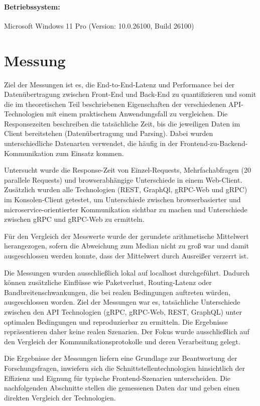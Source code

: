 \paragraph{Betriebssystem:}
Microsoft Windows 11 Pro (Version: 10.0.26100, Build 26100)

\clearpage
\section{Messung}
Ziel der Messungen ist es, die End-to-End-Latenz und Performance bei der Datenübertragung zwischen Front-End und Back-End zu quantifizieren und somit die im theoretischen Teil beschriebenen Eigenschaften der verschiedenen API-Technologien mit einem praktischem Anwendungsfall zu vergleichen.  
Die Responsezeiten beschreiben die tatsächliche Zeit, bis die jeweiligen Daten im Client bereitstehen (Datenübertragung und Parsing). Dabei wurden unterschiedliche Datenarten verwendet, die häufig in der Frontend-zu-Backend-Kommunikation zum Einsatz kommen.  

Untersucht wurde die Response-Zeit von Einzel-Requests, Mehrfachabfragen (20 parallele Requests) und browserabhängige Unterschiede in einem Web-Client. Zusätzlich wurden alle Technologien (REST, GraphQl, gRPC-Web und gRPC) im Konsolen-Client getestet, um Unterschiede zwischen browserbasierter und microservice-orientierter Kommunikation sichtbar zu machen und Unterschiede zwischen gRPC und gRPC-Web zu ermitteln.

Für den Vergleich der Messwerte wurde der gerundete arithmetische Mittelwert herangezogen, sofern die Abweichung zum Median nicht zu groß war und damit ausgeschlossen werden konnte, dass der Mittelwert durch Ausreißer verzerrt ist.

Die Messungen wurden ausschließlich lokal auf localhost durchgeführt. Dadurch können zusätzliche Einflüsse wie Paketverlust, Routing-Latenz oder Bandbreitenschwankungen, die bei realen Bedingungen auftreten würden, ausgeschlossen worden. Ziel der Messungen war es, tatsächliche Unterschiede zwischen den API Technologien (gRPC, gRPC-Web, REST, GraphQL) unter optimalen Bedingungen und reproduzierbar zu ermitteln.
Die Ergebnisse repräsentieren daher keine realen Szenarien. Der Fokus wurde ausschließlich auf den Vergleich der Kommunikationsprotokolle und deren Verarbeitung gelegt.

Die Ergebnisse der Messungen liefern eine Grundlage zur Beantwortung der Forschungsfragen, inwiefern sich die Schnittstellentechnologien hinsichtlich der Effizienz und Eignung für typische Frontend-Szenarien unterscheiden.  
Die nachfolgenden Abschnitte stellen die gemessenen Daten dar und geben einen direkten Vergleich der Technologien.


